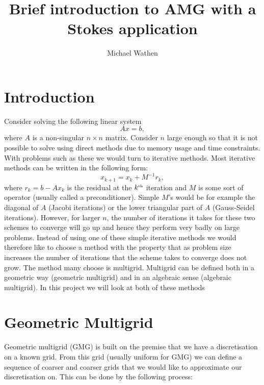 \documentclass[11pt]{article}
\numberwithin{equation}{section}    %
\begin{document}
\pagestyle{fancyplain}
\fancyhead{}
\fancyfoot{} %
\fancyfoot[LE,RO]{\thepage \hspace{-5mm}}
\fancyfoot[CO,RE]{}

\title{Brief introduction to AMG with a Stokes application}
\author{Michael Wathen}
\maketitle




\section{Introduction}

Consider solving the following linear system
$$Ax = b,$$
where $A$ is a non-singular $n \times n$ matrix. Consider $n$ large enough so that it is not possible to solve using direct methods due to memory usage and time constraints. With problems such as these we would turn to iterative methods. Most iterative methods can be written in the following form:
$$x_{k+1} = x_k + M^{-1}r_k,$$
where $r_k = b-Ax_k$ is the residual at the $k^{\mbox{\tiny{th}}}$ iteration and $M$ is some sort of operator (usually called a preconditioner). Simple $M$'s would be for example the diagonal of $A$ (Jacobi iterations) or the lower triangular part of $A$ (Gauss-Seidel iterations). However, for larger  $n$, the number of iterations it takes for these two schemes to converge will go up and hence they perform very badly on large problems. Instead of using one of these simple iterative methods we would therefore like to choose a method with the property that as problem size increases the number of iterations that the scheme takes to converge does not grow. The method many choose is multigrid. Multigrid can be defined both in a geometric way (geometric multigrid) and in an algebraic sense (algebraic multigrid). In this project we will look at both of these methods

\section{Geometric Multigrid}

Geometric multigrid (GMG) is built on the premise that we have a discretisation on a known grid. From this grid (usually uniform for GMG) we can define a sequence of coarser and coarser grids that we would like to approximate our discretisation on. This can be done by the following process:
\end{document}
